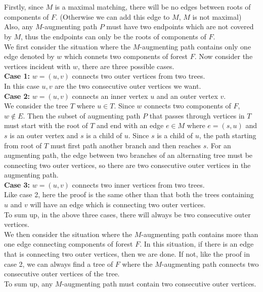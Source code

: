 \documentclass[12pt,letterpaper]{article}
\begin{document}
\newpage
\section{}
Firstly, since $M$ is a maximal matching, 
there will be no edges between roots of components of $F$.
(Otherwise we can add this edge to $M$, $M$ is not maximal)\\
Also, any $M$-augmenting path $P$ must have two endpoints which are not covered by $M$,
thus the endpoints can only be the roots of components of $F$.\\
\newline
We first consider the situation where
the $M$-augmenting path contains only one edge
denoted by $w$ which connets two components of forest $F$.
Now consider the vertices incident with $w$,
there are three possible cases.\\
\textbf{Case 1:}
$w=(u,v)$ connects two outer vertices from two trees.\\
In this case $u,v$ are the two consecutive outer vertices we want.\\
\textbf{Case 2:}
$w=(u,v)$ connects an inner vertex $u$ and an outer vertex $v$.\\
We consider the tree $T$ where $u\in T$. 
Since $w$ connects two components of $F$, $w\notin E$. 
Then the subset of augmenting path $P$ that passes through vertices in $T$ must 
start with the root of $T$ and end with an edge $e\in M$
where $e=(s,u)$ and $s$ is an outer vertex and $s$ is a child of $u$.
Since $s$ is a child of $u$, 
the path starting from root of $T$ must first path another branch and then reaches $s$.
For an augmenting path, the edge between two branches of an alternating tree
must be connecting two outer vertices,
so there are two consecutive outer vertices in the augmenting path.\\
\textbf{Case 3:}
$w=(u,v)$ connects two inner vertices from two trees.\\
Like case 2, here the proof is the same other than that 
both the trees containing $u$ and $v$ will have an edge 
which is connecting two outer vertices.\\
To sum up, in the above three cases,
there will always be two consecutive outer vertices.\\
\newline 
We then consider the situation where the $M$-augmenting path contains more than one edge
connecting components of forest $F$.
In this situation,
if there is an edge that is connecting two outer vertices, 
then we are done.
If not, like the proof in case 2,
we can always find a tree of $F$ where the $M$-augmenting path
connects two consecutive outer vertices of the tree.\\
\newline
To sum up, 
any $M$-augmenting path must contain two consecutive outer vertices.
\end{document}
